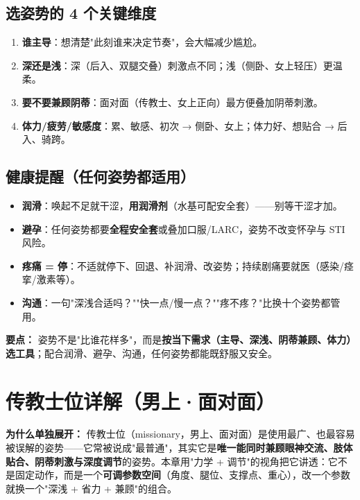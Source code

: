 \documentclass[12pt,UTF8,openany]{ctexbook}
\begin{document}
\section{选姿势的 4 个关键维度}

\begin{enumerate}[leftmargin=2em,itemsep=0.3em]
  \item \textbf{谁主导}：想清楚"此刻谁来决定节奏"，会大幅减少尴尬。
  \item \textbf{深还是浅}：深（后入、双腿交叠）刺激点不同；浅（侧卧、女上轻压）更温柔。
  \item \textbf{要不要兼顾阴蒂}：面对面（传教士、女上正向）最方便叠加阴蒂刺激。
  \item \textbf{体力/疲劳/敏感度}：累、敏感、初次 → 侧卧、女上；体力好、想贴合 → 后入、骑跨。
\end{enumerate}

\section{健康提醒（任何姿势都适用）}

\begin{itemize}[leftmargin=2em,itemsep=0.3em]
  \item \textbf{润滑}：唤起不足就干涩，\textbf{用润滑剂}（水基可配安全套）——别等干涩才加。
  \item \textbf{避孕}：任何姿势都要\textbf{全程安全套}或叠加口服/LARC，姿势不改变怀孕与 STI 风险。
  \item \textbf{疼痛 = 停}：不适就停下、回退、补润滑、改姿势；持续剧痛要就医（感染/痉挛/激素等）。
  \item \textbf{沟通}：一句"深浅合适吗？""快一点/慢一点？""疼不疼？"比换十个姿势都管用。
\end{itemize}

\vspace{1em}
\noindent\textbf{要点：} 姿势不是"比谁花样多"，而是\textbf{按当下需求（主导、深浅、阴蒂兼顾、体力）选工具}；配合润滑、避孕、沟通，任何姿势都能既舒服又安全。

\chapter{传教士位详解（男上·面对面）}
\label{chap:missionary}

\noindent\textbf{为什么单独展开：} 传教士位（missionary，男上、面对面）是使用最广、也最容易被误解的姿势——它常被说成"最普通"，其实它是\textbf{唯一能同时兼顾眼神交流、肢体贴合、阴蒂刺激与深度调节}的姿势。本章用"力学 + 调节"的视角把它讲透：它不是固定动作，而是一个\textbf{可调参数空间}（角度、腿位、支撑点、重心），改一个参数就换一个"深浅 + 省力 + 兼顾"的组合。
\end{document}
